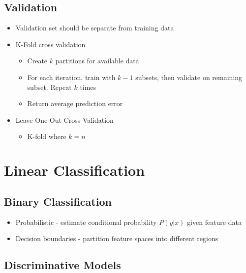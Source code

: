 \documentclass[12pt]{article}
\begin{document}
\subsection{Validation}

\begin{itemize}
	\item Validation set should be separate from training data 
	\item K-Fold cross validation
	\begin{itemize}
		\item Create $k$ partitions for available data 
		\item For each iteration, train with $k - 1$ subsets, then validate on remaining subset. Repeat $k$ times
		\item Return average prediction error
	\end{itemize}
	\item Leave-One-Out Cross Validation
	\begin{itemize}
		\item K-fold where $k = n$
	\end{itemize}
\end{itemize}

\section{Linear Classification}

\subsection{Binary Classification}

\begin{itemize}
	\item Probabilistic - estimate conditional probability $P(y | x)$ given feature data
	\item Decision boundaries - partition feature spaces into different regions
\end{itemize}

\subsection{Discriminative Models}
\end{document}
